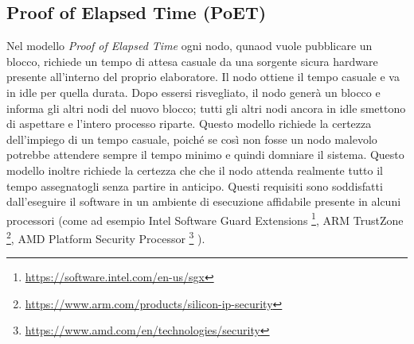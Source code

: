 \subsection{Proof of Elapsed Time (PoET)}
Nel modello \textit{Proof of Elapsed Time} ogni nodo, qunaod vuole pubblicare un blocco,
richiede un tempo di attesa casuale da una
sorgente sicura hardware presente all'interno del proprio elaboratore.
Il nodo ottiene il tempo casuale e va in idle per quella durata. Dopo essersi risvegliato,
il nodo generà un blocco e informa gli altri nodi del nuovo blocco; tutti gli altri nodi ancora
in idle smettono di aspettare e l'intero processo riparte.
Questo modello richiede la certezza dell'impiego di un tempo casuale, poiché se così non fosse
un nodo malevolo potrebbe attendere sempre il tempo minimo e quindi domniare il sistema.
Questo modello inoltre richiede la certezza che che il nodo attenda realmente tutto il tempo
assegnatogli senza partire in anticipo.
Questi requisiti sono soddisfatti dall'eseguire il software in un ambiente di esecuzione affidabile
presente in alcuni processori
(come ad esempio Intel Software Guard Extensions
\footnote{\href{https://software.intel.com/en-us/sgx}{https://software.intel.com/en-us/sgx}},
ARM TrustZone
\footnote{\href{https://www.arm.com/products/silicon-ip-security}{https://www.arm.com/products/silicon-ip-security}},
AMD Platform Security Processor
\footnote{\href{https://www.amd.com/en/technologies/security}{https://www.amd.com/en/technologies/security}}
).

